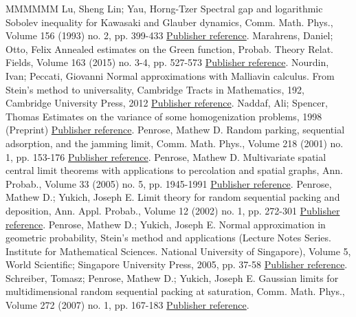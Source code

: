 \begin{thebibliography}{MMMMMM}
 Lu, Sheng Lin; Yau, Horng-Tzer Spectral gap and logarithmic Sobolev inequality for Kawasaki and Glauber dynamics, Comm. Math. Phys., Volume 156 (1993) no. 2, pp. 399-433 \href{https://ahl.centre-mersenne.org/item/AHL_2020__3__825_0/#Lu-Yau-93}{Publisher reference}.
 Marahrens, Daniel; Otto, Felix Annealed estimates on the Green function, Probab. Theory Relat. Fields, Volume 163 (2015) no. 3-4, pp. 527-573 \href{https://ahl.centre-mersenne.org/item/AHL_2020__3__825_0/#Marahrens-Otto-15}{Publisher reference}.
 Nourdin, Ivan; Peccati, Giovanni Normal approximations with Malliavin calculus. From Stein’s method to universality, Cambridge Tracts in Mathematics, 192, Cambridge University Press, 2012 \href{https://ahl.centre-mersenne.org/item/AHL_2020__3__825_0/#Nourdin-Peccati-12}{Publisher reference}.
 Naddaf, Ali; Spencer, Thomas Estimates on the variance of some homogenization problems, 1998 (Preprint) \href{https://ahl.centre-mersenne.org/item/AHL_2020__3__825_0/#Naddaf-Spencer-98}{Publisher reference}.
 Penrose, Mathew D. Random parking, sequential adsorption, and the jamming limit, Comm. Math. Phys., Volume 218 (2001) no. 1, pp. 153-176 \href{https://ahl.centre-mersenne.org/item/AHL_2020__3__825_0/#Penrose-01}{Publisher reference}.
 Penrose, Mathew D. Multivariate spatial central limit theorems with applications to percolation and spatial graphs, Ann. Probab., Volume 33 (2005) no. 5, pp. 1945-1991 \href{https://ahl.centre-mersenne.org/item/AHL_2020__3__825_0/#Penrose-05}{Publisher reference}.
 Penrose, Mathew D.; Yukich, Joseph E. Limit theory for random sequential packing and deposition, Ann. Appl. Probab., Volume 12 (2002) no. 1, pp. 272-301 \href{https://ahl.centre-mersenne.org/item/AHL_2020__3__825_0/#Penrose-Yukich-02}{Publisher reference}.
 Penrose, Mathew D.; Yukich, Joseph E. Normal approximation in geometric probability, Stein’s method and applications (Lecture Notes Series. Institute for Mathematical Sciences. National University of Singapore), Volume 5, World Scientific; Singapore University Press, 2005, pp. 37-58 \href{https://ahl.centre-mersenne.org/item/AHL_2020__3__825_0/#PY-05}{Publisher reference}.
 Schreiber, Tomasz; Penrose, Mathew D.; Yukich, Joseph E. Gaussian limits for multidimensional random sequential packing at saturation, Comm. Math. Phys., Volume 272 (2007) no. 1, pp. 167-183 \href{https://ahl.centre-mersenne.org/item/AHL_2020__3__825_0/#Schreiber-Penrose-Yukich-07}{Publisher reference}.

\end{thebibliography}
